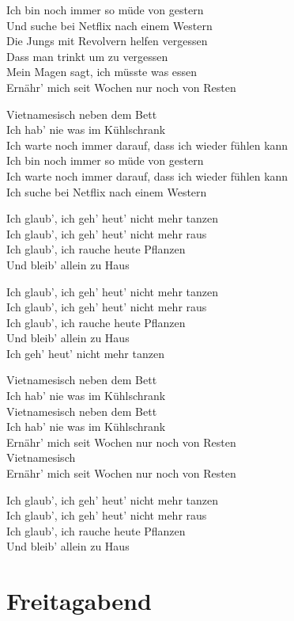 \documentclass[]{book}
\begin{document}
Ich bin noch immer so müde von gestern\\
Und suche bei Netflix nach einem Western\\
Die Jungs mit Revolvern helfen vergessen\\
Dass man trinkt um zu vergessen\\
Mein Magen sagt, ich müsste was essen\\
Ernähr' mich seit Wochen nur noch von Resten

Vietnamesisch neben dem Bett\\
Ich hab' nie was im Kühlschrank\\
Ich warte noch immer darauf, dass ich wieder fühlen kann\\
Ich bin noch immer so müde von gestern\\
Ich warte noch immer darauf, dass ich wieder fühlen kann\\
Ich suche bei Netflix nach einem Western

Ich glaub', ich geh' heut' nicht mehr tanzen\\
Ich glaub', ich geh' heut' nicht mehr raus\\
Ich glaub', ich rauche heute Pflanzen\\
Und bleib' allein zu Haus

Ich glaub', ich geh' heut' nicht mehr tanzen\\
Ich glaub', ich geh' heut' nicht mehr raus\\
Ich glaub', ich rauche heute Pflanzen\\
Und bleib' allein zu Haus\\
Ich geh' heut' nicht mehr tanzen

Vietnamesisch neben dem Bett\\
Ich hab' nie was im Kühlschrank\\
Vietnamesisch neben dem Bett\\
Ich hab' nie was im Kühlschrank\\
Ernähr' mich seit Wochen nur noch von Resten\\
Vietnamesisch\\
Ernähr' mich seit Wochen nur noch von Resten

Ich glaub', ich geh' heut' nicht mehr tanzen\\
Ich glaub', ich geh' heut' nicht mehr raus\\
Ich glaub', ich rauche heute Pflanzen\\
Und bleib' allein zu Haus

\hypertarget{freitagabend}{%
\section{Freitagabend}\label{freitagabend}}
\end{document}

